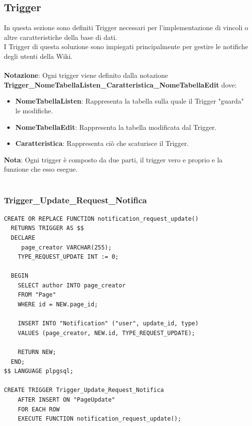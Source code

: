 \documentclass{article}
\begin{document}
\newpage


    

	
\subsection{Trigger}
	In questa sezione sono definiti Trigger necessari per l'implementazione di vincoli o altre caratteristiche della base di dati.
	\\
	I Trigger di questa soluzione sono impiegati principalmente per gestire le notifiche degli utenti della Wiki.
	\\\\
	\textbf{Notazione}: Ogni trigger viene definito dalla notazione \textbf{Trigger\_NomeTabellaListen\_Caratteristica\_NomeTabellaEdit} dove:
	
	\begin{itemize}
		\item \textbf{NomeTabellaListen}: Rappresenta la tabella sulla quale il Trigger "guarda" le modifiche.
		\item \textbf{NomeTabellaEdit}: Rappresenta la tabella modificata dal Trigger.
		\item \textbf{Caratteristica}: Rappresenta ci\`o che scaturisce il Trigger.
		\\
	\end{itemize}	
\textbf{Nota}: Ogni trigger \`e composto da due parti, il trigger vero e proprio e la funzione che esso esegue.
\\\\

	
	\subsubsection{Trigger\_Update\_Request\_Notifica}
	
	\begin{lstlisting}[style=SQL]
CREATE OR REPLACE FUNCTION notification_request_update()
  RETURNS TRIGGER AS $$
  DECLARE
	 page_creator VARCHAR(255); 
	TYPE_REQUEST_UPDATE INT := 0;
			
  BEGIN
	SELECT author INTO page_creator
	FROM "Page"
	WHERE id = NEW.page_id;
		
	INSERT INTO "Notification" ("user", update_id, type)
	VALUES (page_creator, NEW.id, TYPE_REQUEST_UPDATE);
		
	RETURN NEW;
  END;
$$ LANGUAGE plpgsql;
		
CREATE TRIGGER Trigger_Update_Request_Notifica
	AFTER INSERT ON "PageUpdate"
	FOR EACH ROW
	EXECUTE FUNCTION notification_request_update();
	\end{lstlisting}
	
\end{document}
